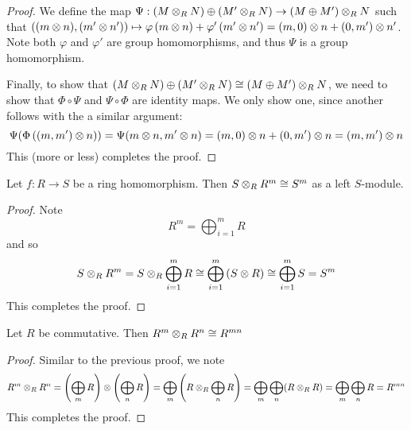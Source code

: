 \begin{proof}
We define the map $\Psi:(M\otimes _R N)\oplus (M'\otimes_R N) \to (M\oplus M')\otimes_R N$ such that $((m\otimes n), (m'\otimes n'))\mapsto \varphi \left(m\otimes n\right) + \varphi' \left(m'\otimes n'\right)=(m,0)\otimes n + (0,m')\otimes n'$. Note both $\varphi$ and $\varphi'$ are group homomorphisms, and thus $\Psi$ is a group homomorphism. 

Finally, to show that $(M\otimes _R N)\oplus (M'\otimes_R N) \cong (M\oplus M')\otimes_R N$, we need to show that $\Phi\circ  \Psi$ and $\Psi\circ \Phi$ are identity maps. We only show one, since another follows with the a similar argument:
\[\Psi(\Phi \left((m,m')\otimes n\right)) = \Psi(m\otimes n, m'\otimes n) = (m,0)\otimes n + (0,m')\otimes n = (m,m')\otimes n\]
This (more or less) completes the proof.
\end{proof}

\begin{cor}
    Let $f:R\to S$ be a ring homomorphism. Then $S\otimes_R R^m \cong S^m$ as a left $S$-module.
\end{cor}
\begin{proof}
    Note
    \[R^m = \bigoplus_{i=1}^mR\]
    and so 
    \[S\otimes_R R^m =S\otimes_R \bigoplus_{i=1}^m R\cong \bigoplus_{i=1}^m\left(S\otimes R\right) \cong \bigoplus_{i=1}^m S= S^m\]
    This completes the proof.
\end{proof}

\begin{cor}
    Let $R$ be commutative. Then $R^m \otimes_R R^n \cong R^{mn}$
\end{cor}
\begin{proof}
    Similar to the previous proof, we note
    \[R^m \otimes_R R^n = \left(\bigoplus_m R\right) \otimes \left(\bigoplus_n R\right) = \bigoplus_m \left(R\otimes_R \bigoplus_n R\right) = \bigoplus_m \bigoplus_n (R\otimes_R R) = \bigoplus_m \bigoplus_n R = R^{mn}\]
    This completes the proof.
\end{proof}